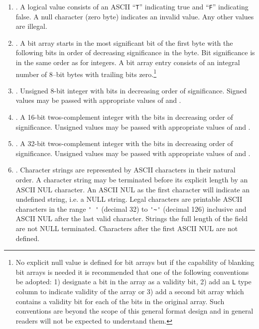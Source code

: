 \begin{enumerate} %
\item  {}. A logical value consists of an ASCII ``\verb|T|''
indicating true and ``\verb|F|'' indicating false.  A null character
(zero byte) indicates an invalid value.
Any other values are illegal.

\item {}. A bit array starts in the most significant bit of
the first byte with the following bits in order of decreasing
significance in the byte.  Bit significance is in the same order as
for integers.  A bit array entry consists of an integral number of
8--bit bytes with trailing bits zero.\footnote{No explicit null value is
defined for bit arrays but if the 
capability of blanking bit arrays is needed it is recommended that one
of the following conventions be adopted: 1) designate a bit in the
array as a validity bit, 2) add an \verb|L| type column to indicate
validity of the array or 3) add a second bit array which contains a
validity bit for each of the bits in the original array.  Such
conventions are beyond the scope of this general format design and in
general readers will not be expected to understand them.}

\item {}.  Unsigned 8-bit integer with bits in decreasing order
of significance.  Signed values may be passed with appropriate values
of  and .
\item {}. A 16-bit twos-complement integer with the bits
in decreasing order of significance.  Unsigned values may be passed
with appropriate values of  and .
\item {}. A 32-bit twos-complement integer with the bits
in decreasing order of significance.  Unsigned values may be passed
with appropriate values of  and .

\item \label{item_a_type} . Character strings are
represented by ASCII characters in their natural order.  A character
string may be terminated before its explicit length by an ASCII NUL
character. An ASCII NUL as the first character will indicate an
undefined string, i.e. a NULL string. Legal characters are printable
ASCII characters in the range \verb*|' '| (decimal 32) to \verb|'~'|
(decimal 126) inclusive and ASCII NUL after the last valid character.
Strings the full length of the field are not NULL terminated.
Characters after the first ASCII NUL are not defined.


\end{enumerate}
